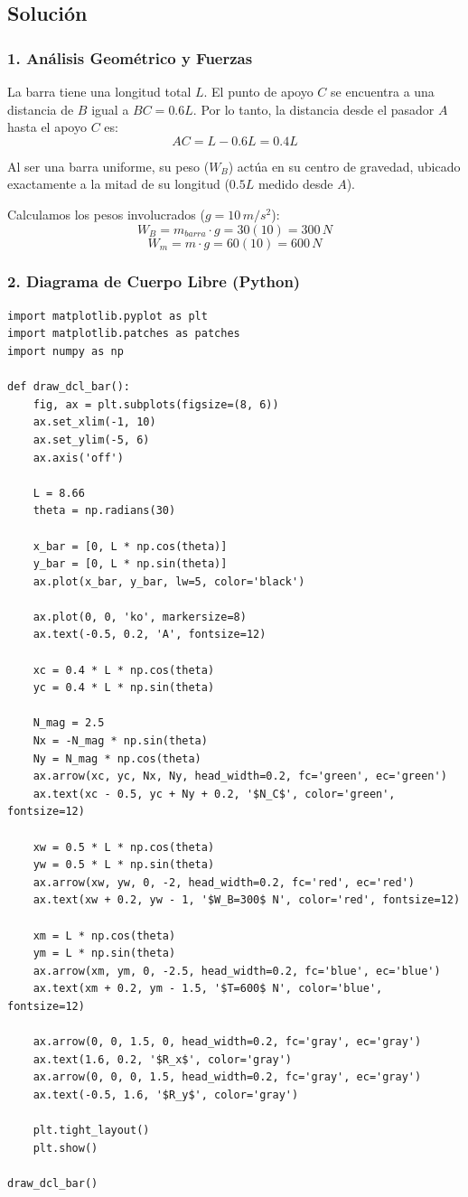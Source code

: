 \documentclass[12pt, a4paper]{article}
\begin{document}
\subsection*{Solución}

\subsubsection*{1. Análisis Geométrico y Fuerzas}
La barra tiene una longitud total $L$. El punto de apoyo $C$ se encuentra a una distancia de $B$ igual a $BC = 0.6L$. 
Por lo tanto, la distancia desde el pasador $A$ hasta el apoyo $C$ es:
$$AC = L - 0.6L = 0.4L$$

Al ser una barra uniforme, su peso ($W_B$) actúa en su centro de gravedad, ubicado exactamente a la mitad de su longitud ($0.5L$ medido desde $A$).

Calculamos los pesos involucrados ($g=10 \, \si{m/s^2}$):
$$W_B = m_{barra} \cdot g = 30(10) = 300 \, \si{N}$$
$$W_m = m \cdot g = 60(10) = 600 \, \si{N}$$

\subsubsection*{2. Diagrama de Cuerpo Libre (Python)}
\begin{lstlisting}
import matplotlib.pyplot as plt
import matplotlib.patches as patches
import numpy as np

def draw_dcl_bar():
    fig, ax = plt.subplots(figsize=(8, 6))
    ax.set_xlim(-1, 10)
    ax.set_ylim(-5, 6)
    ax.axis('off')
    
    L = 8.66 
    theta = np.radians(30)
    
    x_bar = [0, L * np.cos(theta)]
    y_bar = [0, L * np.sin(theta)]
    ax.plot(x_bar, y_bar, lw=5, color='black')
    
    ax.plot(0, 0, 'ko', markersize=8)
    ax.text(-0.5, 0.2, 'A', fontsize=12)
    
    xc = 0.4 * L * np.cos(theta)
    yc = 0.4 * L * np.sin(theta)
    
    N_mag = 2.5
    Nx = -N_mag * np.sin(theta)
    Ny = N_mag * np.cos(theta)
    ax.arrow(xc, yc, Nx, Ny, head_width=0.2, fc='green', ec='green')
    ax.text(xc - 0.5, yc + Ny + 0.2, '$N_C$', color='green', fontsize=12)
    
    xw = 0.5 * L * np.cos(theta)
    yw = 0.5 * L * np.sin(theta)
    ax.arrow(xw, yw, 0, -2, head_width=0.2, fc='red', ec='red')
    ax.text(xw + 0.2, yw - 1, '$W_B=300$ N', color='red', fontsize=12)
    
    xm = L * np.cos(theta)
    ym = L * np.sin(theta)
    ax.arrow(xm, ym, 0, -2.5, head_width=0.2, fc='blue', ec='blue')
    ax.text(xm + 0.2, ym - 1.5, '$T=600$ N', color='blue', fontsize=12)
    
    ax.arrow(0, 0, 1.5, 0, head_width=0.2, fc='gray', ec='gray')
    ax.text(1.6, 0.2, '$R_x$', color='gray')
    ax.arrow(0, 0, 0, 1.5, head_width=0.2, fc='gray', ec='gray')
    ax.text(-0.5, 1.6, '$R_y$', color='gray')

    plt.tight_layout()
    plt.show()

draw_dcl_bar()
\end{lstlisting}
\end{document}
